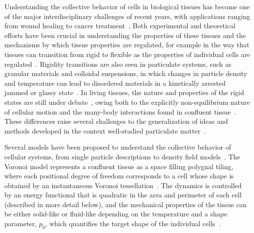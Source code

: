 \documentclass[reprint,amsmath,amssymb,aps]{revtex4-2}
\begin{document}
Understanding the collective behavior of cells in biological tissues has become one of the major interdisciplinary challenges of recent years, with applications ranging from wound healing to cancer treatment~\cite{Ghosh2007, Gov2009, Park2015, Tambe2011, PerezGonzalez2018, Sunyer2016}. Both experimental and theoretical efforts have been crucial in understanding the properties of these tissues and the mechanisms by which tissue properties are regulated, for example in the way that tissues can transition from rigid to flexible as the properties of individual cells are regulated~\cite{Angelini2011, Garcia2015, Park2015, Schotz2013, mongera2018fluid,Grosser2021,devany2021cell}. Rigidity transitions are also seen in particulate systems, such as granular materials and colloidal suspensions, in which changes in particle density and temperature can lead to disordered materials in a kinetically arrested jammed or glassy state~\cite{Binder1986, Berthier2011, Janssen2019}. In living tissues, the nature and properties of the rigid states are still under debate~\cite{Angelini2011, Garcia2015, Park2015, Schotz2013}, owing both to the explicitly non-equilibrium nature of cellular motion and the many-body interactions found in confluent tissue~\cite{Szavo2006}. These differences raise several challenges to the generalization of ideas and methods developed in the context well-studied particulate matter~\cite{Merkel2018, Merkel2019, Angelini2011, Tambe2011, PerezGonzalez2018}.

Several models have been proposed to understand the collective behavior of cellular systems, from single particle descriptions to density field models~\cite{Bi2014, Bi2015, Farhadifar2007, Fletcher2014, Camley2017, Kabla2012}. The Voronoi model represents a confluent tissue as a space filling polygnal tiling, where each positional degree of freedom corresponds to a cell whose shape is obtained by an instantaneous Voronoi tessellation~\cite{Bi2016,Kaliman2016, Sussman2018a}. The dynamics is controlled by an energy functional that is quadratic in the area and perimeter of each cell (described in more detail below), and the mechanical properties of the tissue can be either solid-like or fluid-like depending on the temperature and a shape parameter, $p_0$, which quantifies the target shape of the individual cells~\cite{Bi2016}.
\end{document}
